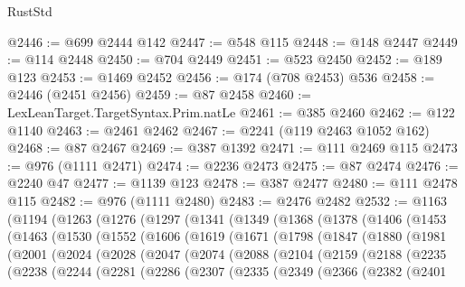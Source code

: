\begin{lexlean}{RustStd}
\begin{coremodule}
@2446 := @699 @2444 @142
@2447 := @548 @115
@2448 := @148 @2447
@2449 := @114 @2448
@2450 := @704 @2449
@2451 := @523 @2450
@2452 := @189 @123
@2453 := @1469 @2452
@2456 := @174 (@708 @2453) @536
@2458 := @2446 (@2451 @2456)
@2459 := @87 @2458
@2460 := LexLeanTarget.TargetSyntax.Prim.natLe
@2461 := @385 @2460
@2462 := @122 @1140
@2463 := @2461 @2462
@2467 := @2241 (@119 @2463 @1052 @162)
@2468 := @87 @2467
@2469 := @387 @1392
@2471 := @111 @2469 @115
@2473 := @976 (@1111 @2471)
@2474 := @2236 @2473
@2475 := @87 @2474
@2476 := @2240 @47
@2477 := @1139 @123
@2478 := @387 @2477
@2480 := @111 @2478 @115
@2482 := @976 (@1111 @2480)
@2483 := @2476 @2482
@2532 := @1163
    (@1194
      (@1263
        (@1276
          (@1297
            (@1341
              (@1349
                (@1368
                  (@1378
                    (@1406
                      (@1453
                        (@1463
                          (@1530
                            (@1552
                              (@1606
                                (@1619
                                  (@1671
                                    (@1798
                                      (@1847
                                        (@1880
                                          (@1981
                                            (@2001
                                              (@2024
                                                (@2028
                                                  (@2047
                                                    (@2074
                                                      (@2088
                                                        (@2104
                                                          (@2159
                                                            (@2188
                                                              (@2235
                                                                (@2238
                                                                  (@2244
                                                                    (@2281
                                                                      (@2286
                                                                        (@2307
                                                                          (@2335
                                                                            (@2349
                                                                              (@2366
                                                                                (@2382
                                                                                  (@2401

\end{coremodule}
\end{lexlean}

